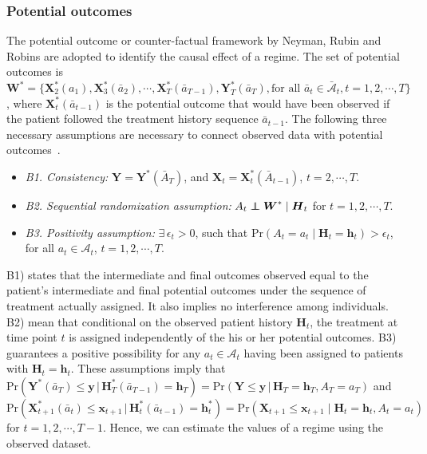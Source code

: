 \documentclass{article}
\newcommand{\bs}{ \boldsymbol}
\newcommand{\ml}{\mathcal}
\newcommand{\br}{\bar}
\newcommand{\txt}{\text}
\newcommand\indep{\protect\mathpalette{\protect\independenT}{\perp}}
\def\independenT#1#2{\mathrel{\rlap{$#1#2$}\mkern2mu{#1#2}}}
\begin{document}
 \subsubsection{Potential outcomes}
 The potential outcome or counter-factual framework by Neyman, Rubin and Robins are adopted to identify the causal effect of a regime. The set of potential outcomes is $\bs{W}^* = \{ \bs{X}^*_2(a_1), \bs{X}^*_3(\br{a}_2), \cdots, \bs{X}^*_T(\br{a}_{T-1}), \bs{Y}^*_T(\br{a}_T), \text{for all } \br{a}_t \in \br{\ml{A}}_t, t=1, 2, \cdots, T \}$, where $\bs{X}^*_t(\br{a}_{t-1})$ is the potential outcome that would have been observed if the patient followed the treatment history sequence $\br{a}_{t-1}$. The following three necessary assumptions are necessary to connect  observed data with potential outcomes~\cite{Neyman, Rubin2005, Rubin1980, Robins1997, Hernan2006}.
 \begin{itemize}
 	\item \textit{B1. Consistency:}
 	 $\bs{Y} = \bs{Y}^*(\br{A}_T)$, and $\bs{X}_t = \bs{X}^*_t(\br{A}_{t-1})$, $t = 2, \cdots, T$.
 	\item \textit{B2. Sequential randomization assumption:}
 	$A_{t}  \indep \bs{W}^*  \mid \bs{H}_{t}$ for $t =1 ,2, \cdots, T$.
 	\item \textit{B3. Positivity assumption:} $\exists \, \epsilon_t > 0$, such that $\text{Pr}(A_t = a_t \mid \bs{H}_t=\bs{h}_t) > \epsilon_t$, for all $a_t \in \ml{A}_t$, $t=1, 2, \cdots, T$.
 \end{itemize}
B1) states that the intermediate and final outcomes observed equal to the patient's intermediate and final potential outcomes under the sequence of treatment actually assigned. It also implies no interference among individuals. B2) mean that conditional on the observed patient history $\bs{H}_t$, the treatment at time point $t$ is assigned independently of the his or her potential outcomes. B3) guarantees a positive possibility for any $a_t \in \ml{A}_t$ having been assigned to patients with $\bs{H}_t = \bs{h}_t$. These assumptions imply that $\txt{Pr}(\bs{Y}^*(\br{a}_T) \le \bs{y} \,| \, \bs{H}^*_T(\br{a}_{T-1}) =\bs{h}_T) = \txt{Pr}(\bs{Y} \le \bs{y} \, |\,  \bs{H}_T = \bs{h}_T, A_T=a_T)$ and $\txt{Pr}(\bs{X}_{t+1}^*(\br{a}_{t}) \le \bs{x}_{t+1} \,|\, \bs{H}^*_t(\br{a}_{t-1}) = \bs{h}^*_t) = \txt{Pr}(\bs{X}_{t+1} \le \bs{x}_{t+1} \mid  \bs{H}_t = \bs{h}_t, A_t=a_t)$ for $t = 1, 2, \cdots, T-1$. Hence, we can estimate the values of a regime using the observed dataset.
\end{document}
